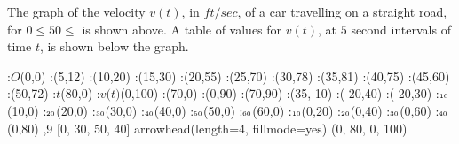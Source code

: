 



\question The graph of the velocity $v(t)$, in $ft/sec$, of a car travelling 
on a straight road, for $0\leq 50\leq$ is shown above. A table of values for
$v(t)$, at $5$ second intervals of time $t$, is shown below the graph.


  \begin{marginfigure}
      :$O$(0,0)
      :(5,12)
      :(10,20)
      :(15,30)
      :(20,55)
      :(25,70)
      :(30,78)
      :(35,81)
      :(40,75)
      :(45,60)
      :(50,72)
      \def\Xmax{80}
      \def\Ymax{100}
      \def\XmaxGrid{70}
      \def\YmaxGrid{90}
      :$\textit{t}$(\Xmax,0)
      :$\textit{v(t)}$(0,\Ymax)
      :(\XmaxGrid,0)
      :(0,\YmaxGrid)
      :(\XmaxGrid,\YmaxGrid)
      :(35,-10) 
      :(-20,40)
      :(-20,30)
      :$\tiny\text{10}$(10,0)
      :$\tiny\text{20}$(20,0)
      :$\tiny\text{30}$(30,0)
      :$\tiny\text{40}$(40,0)
      :$\tiny\text{50}$(50,0)
      :$\tiny\text{60}$(60,0)
      :$\tiny\text{10}$(0,20)
      :$\tiny\text{20}$(0,40)
      :$\tiny\text{30}$(0,60)
      :$\tiny\text{40}$(0,80)
    \figdrawbegin{}
      \figdrawline [0,101]
      \figdrawline [101,102]
      \figdrawline [102,103]
      \figdrawline [103,104]
      \figdrawline [104,105]
      \figdrawline [105,106]
      \figdrawline [106,107]
      \figdrawline [107,108]
      \figdrawline [108,109]
      \figdrawline [109,110]
      ,9 [0, 30, 50, 40]
      \figset arrowhead(length=4, fillmode=yes)
      (0, \Xmax, 0, \Ymax)
    \figdrawend
    \centerline{\box\figBoxA}
  \end{marginfigure}
